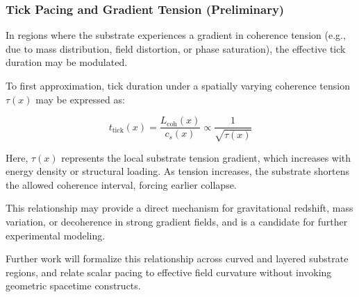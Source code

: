 \documentclass[entropy,article,submit,pdftex,moreauthors]{Definitions/mdpi}
\begin{document}
\subsubsection{Tick Pacing and Gradient Tension (Preliminary)}

In regions where the substrate experiences a gradient in coherence tension (e.g., due to mass distribution, field distortion, or phase saturation), the effective tick duration may be modulated.

To first approximation, tick duration under a spatially varying coherence tension \( \tau(x) \) may be expressed as:

\[
t_{\text{tick}}(x) = \frac{L_{\text{coh}}(x)}{c_s(x)} \propto \frac{1}{\sqrt{\tau(x)}}
\]

Here, \( \tau(x) \) represents the local substrate tension gradient, which increases with energy density or structural loading. As tension increases, the substrate shortens the allowed coherence interval, forcing earlier collapse.

This relationship may provide a direct mechanism for gravitational redshift, mass variation, or decoherence in strong gradient fields, and is a candidate for further experimental modeling.

\smallskip

Further work will formalize this relationship across curved and layered substrate regions, and relate scalar pacing to effective field curvature without invoking geometric spacetime constructs.


\end{document}
